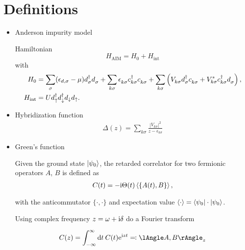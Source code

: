 
\chapter{Definitions}

\begin{itemize}
    \item Anderson impurity model

          Hamiltonian
          \begin{equation}
              H_\mathrm{AIM} = H_0 + H_\mathrm{int}
              \label{eq:H_AIM}
          \end{equation}
          with
          \begin{align}
              H_0
               & =
              \sum_{\pk\sigma} (\epsilon_{d,\sigma} - \mu) d^\dag_{\pk\sigma} d^{\pdag}_{\pk\sigma}
              +
              \sum_{k\sigma} \epsilon_{k\sigma}^{\pdag} c^\dag_{k\sigma} c^{\pdag}_{k\sigma}
              +
              \sum_{k\sigma} \left(V^{\ps}_{k\sigma} d^\dag_{\vphantom{k}\sigma} c^{\pdag}_{k\sigma}
              + V_{k\sigma}^* c^\dag_{k\sigma} d^{\pdag}_{\vphantom{k}\sigma} \right),
              \\
              H_\mathrm{int}
               & =
              U d^\dag_\uparrow d^\dag_\downarrow d_\downarrow d_\uparrow.
          \end{align}

    \item Hybridization function
          \begin{align}
              \Delta(z) = \sum_{k\sigma} \frac{|V_{k\sigma}|^2}{z - \epsilon_{k\sigma}}
          \end{align}
    \item Green's function

          Given the ground state $\ket{\psi_0}$,
          the retarded correlator for two fermionic operators $A$, $B$ is defined as
          \begin{align}
              C(t) = -\mathrm{i} \Theta(t) \braket{\{A(t), B\}},
          \end{align}

          with the anticommutator $\{\cdot,\cdot\}$
          and expectation value $\braket{\cdot} = \braket{\psi_0 | \cdot | \psi_0}$.

          Using complex frequency $z = \omega + \mathrm{i} \delta$ do a Fourier transform

          \begin{equation}
              C(z) = \int_{-\infty}^\infty \md t\>C(t) \me^{\mi zt} \eqqcolon \lAngle A, B \rAngle_z
          \end{equation}


\end{itemize}
